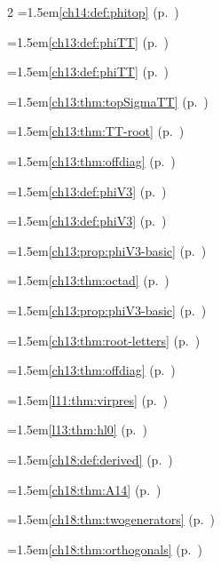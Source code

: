 \begin{multicols}{2}
\hangindent=1.5em\quad \ref{ch14:def:phitop} (p.~\pageref{ch14:def:phitop})\par
\hangindent=1.5em\quad \ref{ch13:def:phiTT} (p.~\pageref{ch13:def:phiTT})\par
\hangindent=1.5em\quad \ref{ch13:def:phiTT} (p.~\pageref{ch13:def:phiTT})\par
\hangindent=1.5em\quad \ref{ch13:thm:topSigmaTT} (p.~\pageref{ch13:thm:topSigmaTT})\par
\hangindent=1.5em\quad \ref{ch13:thm:TT-root} (p.~\pageref{ch13:thm:TT-root})\par
\hangindent=1.5em\quad \ref{ch13:thm:offdiag} (p.~\pageref{ch13:thm:offdiag})\par
\hangindent=1.5em\quad \ref{ch13:def:phiV3} (p.~\pageref{ch13:def:phiV3})\par
\hangindent=1.5em\quad \ref{ch13:def:phiV3} (p.~\pageref{ch13:def:phiV3})\par
\hangindent=1.5em\quad \ref{ch13:prop:phiV3-basic} (p.~\pageref{ch13:prop:phiV3-basic})\par
\hangindent=1.5em\quad \ref{ch13:thm:octad} (p.~\pageref{ch13:thm:octad})\par
\hangindent=1.5em\quad \ref{ch13:prop:phiV3-basic} (p.~\pageref{ch13:prop:phiV3-basic})\par
\hangindent=1.5em\quad \ref{ch13:thm:root-letters} (p.~\pageref{ch13:thm:root-letters})\par
\hangindent=1.5em\quad \ref{ch13:thm:offdiag} (p.~\pageref{ch13:thm:offdiag})\par
\hangindent=1.5em\quad \ref{l11:thm:virpres} (p.~\pageref{l11:thm:virpres})\par
\hangindent=1.5em\quad \ref{l13:thm:hl0} (p.~\pageref{l13:thm:hl0})\par
\hangindent=1.5em\quad \ref{ch18:def:derived} (p.~\pageref{ch18:def:derived})\par
\hangindent=1.5em\quad \ref{ch18:thm:A14} (p.~\pageref{ch18:thm:A14})\par
\hangindent=1.5em\quad \ref{ch18:thm:twogenerators} (p.~\pageref{ch18:thm:twogenerators})\par
\hangindent=1.5em\quad \ref{ch18:thm:orthogonals} (p.~\pageref{ch18:thm:orthogonals})\par

\end{multicols}
